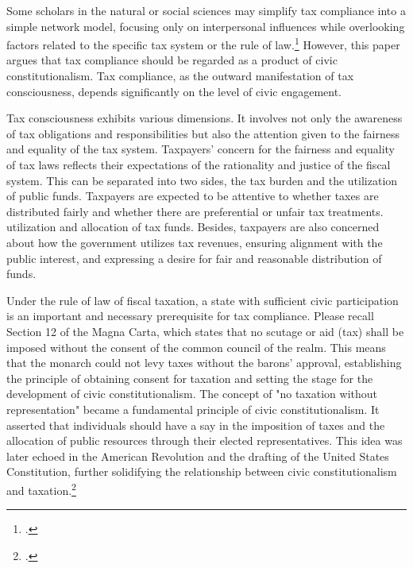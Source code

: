 \documentclass[]{article}
\begin{document}
Some scholars in the natural or social sciences may simplify tax compliance into a simple network model, focusing only on interpersonal influences while overlooking factors related to the specific tax system or the rule of law.\footcite{DiGioacchino2020} However, this paper argues that tax compliance should be regarded as a product of civic constitutionalism. Tax compliance, as the outward manifestation of tax consciousness, depends significantly on the level of civic engagement.


Tax consciousness exhibits various dimensions.
It involves not only the awareness of tax obligations and responsibilities but also the attention given to the fairness and equality of the tax system. Taxpayers' concern for the fairness and equality of tax laws reflects their expectations of the rationality and justice of the fiscal system. This can be separated into two sides, the tax burden and the utilization of public funds. Taxpayers are expected to be attentive to whether taxes are distributed fairly and whether there are preferential or unfair tax treatments. utilization and allocation of tax funds. Besides, taxpayers are also concerned about how the government utilizes tax revenues, ensuring alignment with the public interest, and expressing a desire for fair and reasonable distribution of funds.

Under the rule of law of fiscal taxation, a state with sufficient civic participation is an important and necessary prerequisite for tax compliance.
Please recall Section 12 of the Magna Carta, which states that no scutage or aid (tax) shall be imposed without the consent of the common council of the realm. This means that the monarch could not levy taxes without the barons' approval, establishing the principle of obtaining consent for taxation and setting the stage for the development of civic constitutionalism.
The concept of "no taxation without representation" became a fundamental principle of civic constitutionalism. 
It asserted that individuals should have a say in the imposition of taxes and the allocation of public resources through their elected representatives. This idea was later echoed in the American Revolution and the drafting of the United States Constitution, further solidifying the relationship between civic constitutionalism and taxation.\footcite{2023b}
\end{document}
